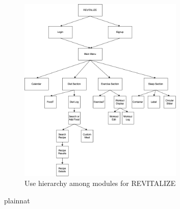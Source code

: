 \documentclass[12pt, titlepage]{article}
\begin{document}
\begin{figure}[H]
	\centering
	\includegraphics[width=0.7\textwidth]{images/MGDAG.png}
	\caption{Use hierarchy among modules for REVITALIZE}
	\label{FigUH}
\end{figure}


 {plainnat}


\newpage{}
\end{document}
